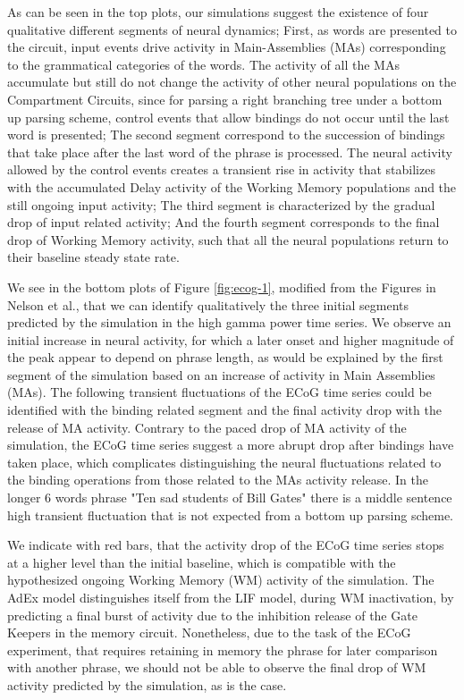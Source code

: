 \documentclass[10pt]{article}
\begin{document}
As can be seen in the top plots, our simulations suggest the existence of four qualitative different segments of neural dynamics;
First, as words are presented to the circuit, input events drive activity in Main-Assemblies (MAs) corresponding to the grammatical categories of the words.
The activity of all the MAs accumulate but still do not change the activity of other neural populations on the Compartment Circuits, since for parsing a right branching tree under a bottom up parsing scheme, control events that allow bindings do not occur until the last word is presented;
The second segment correspond to the succession of bindings that take place after the last word of the phrase is processed.
The neural activity allowed by the control events creates a transient rise in activity that stabilizes with the accumulated Delay activity of the Working Memory populations and the still ongoing input activity;
The third segment is characterized by the gradual drop of input related activity;
And the fourth segment corresponds to the final drop of Working Memory activity, such that all the neural populations return to their baseline steady state rate.

We see in the bottom plots of Figure \ref{fig:ecog-1}, modified from the Figures in Nelson et al., that we can identify qualitatively the three initial segments predicted by the simulation in the high gamma power time series.
We observe an initial increase in neural activity, for which a later onset and higher magnitude of the peak appear to depend on phrase length, as would be explained by the first segment of the simulation based on an increase of activity in Main Assemblies (MAs).
The following transient fluctuations of the ECoG time series could be identified with the binding related segment and the final activity drop with the release of MA activity.
Contrary to the paced drop of MA activity of the simulation, the ECoG time series suggest a more abrupt drop after bindings have taken place, which complicates distinguishing the neural fluctuations related to the binding operations from those related to the MAs activity release.
In the longer 6 words phrase "Ten sad students of Bill Gates" there is a middle sentence high transient fluctuation that is not expected from a bottom up parsing scheme.

We indicate with red bars, that the activity drop of the ECoG time series stops at a higher level than the initial baseline, which is compatible with the hypothesized ongoing Working Memory (WM) activity of the simulation.
The AdEx model distinguishes itself from the LIF model, during WM inactivation, by predicting a final burst of activity due to the inhibition release of the Gate Keepers in the memory circuit.
Nonetheless, due to the task of the ECoG experiment, that requires retaining in memory the phrase for later comparison with another phrase, we should not be able to observe the final drop of WM activity predicted by the simulation, as is the case.
\end{document}
